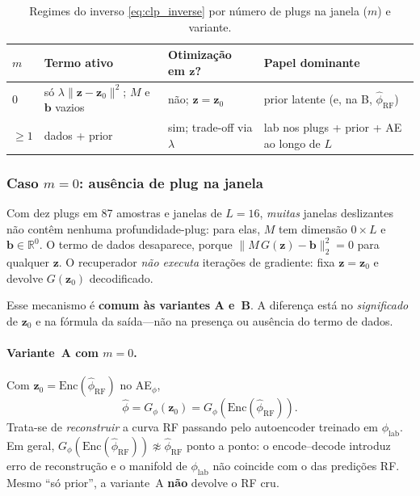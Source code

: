 \documentclass[11pt,a4paper]{article}
\newcommand{\zvec}{\ensuremath{\mathbf{z}}}
\newcommand{\zzero}{\ensuremath{\mathbf{z}_0}}
\begin{document}
\begin{table}[H]
  \centering
  \caption{Regimes do inverso \eqref{eq:clp_inverse} por número de plugs
           na janela ($m$) e variante.}
  \label{tab:clp_m_balance}
  \small
  \begin{tabular}{p{1.2cm}p{4.5cm}p{4.8cm}p{3.8cm}}
    \toprule
    $m$ & Termo ativo & Otimização em $\zvec$? & Papel dominante \\
    \midrule
    $0$ &
      só $\lambda\|\zvec-\zzero\|^2$;
      $M$ e $\mathbf{b}$ vazios &
      não; $\zvec=\zzero$ &
      prior latente (e, na B, $\widehat{\phi}_{\mathrm{RF}}$) \\
    $\ge 1$ &
      dados + prior &
      sim; trade-off via $\lambda$ &
      lab nos plugs + prior + AE ao longo de $L$ \\
    \bottomrule
  \end{tabular}
\end{table}

\subsubsection{Caso \texorpdfstring{$m=0$}{m=0}: ausência de plug na janela}

Com dez plugs em 87 amostras e janelas de $L=16$, \emph{muitas} janelas
deslizantes não contêm nenhuma profundidade-plug: para elas, $M$ tem
dimensão $0\times L$ e $\mathbf{b}\in\mathbb{R}^0$.
O termo de dados desaparece, porque
$\|M\,G(\zvec)-\mathbf{b}\|_2^2=0$ para qualquer $\zvec$.
O recuperador \emph{não executa} iterações de gradiente: fixa
$\zvec=\zzero$ e devolve $G(\zzero)$ decodificado.

Esse mecanismo é \textbf{comum às variantes A e~B}.
A diferença está no \emph{significado} de $\zzero$ e na fórmula da
saída---não na presença ou ausência do termo de dados.

\paragraph{Variante~A com $m=0$.}
Com $\zzero=\mathrm{Enc}(\widehat{\phi}_{\mathrm{RF}})$ no
AE$_{\phi}$,
\begin{equation}
  \widehat{\phi}
  =
  G_{\phi}(\zzero)
  =
  G_{\phi}\!\left(\mathrm{Enc}(\widehat{\phi}_{\mathrm{RF}})\right).
  \label{eq:clp_a_m0}
\end{equation}
Trata-se de \emph{reconstruir} a curva RF passando pelo autoencoder
treinado em $\phi_{\mathrm{lab}}$.
Em geral,
$G_{\phi}(\mathrm{Enc}(\widehat{\phi}_{\mathrm{RF}}))
\not\approx \widehat{\phi}_{\mathrm{RF}}$
ponto a ponto: o encode--decode introduz erro de reconstrução e o
manifold de $\phi_{\mathrm{lab}}$ não coincide com o das predições RF.
Mesmo ``só prior'', a variante~A \textbf{não} devolve o RF cru.
\end{document}
